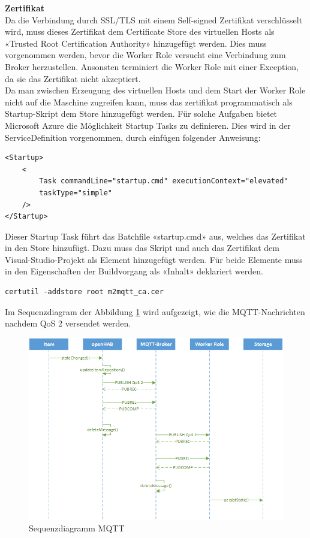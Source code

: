 \textbf{Zertifikat} \\
Da die Verbindung durch SSL/TLS mit einem Self-signed Zertifikat verschlüsselt wird, muss dieses Zertifikat dem Certificate Store des virtuellen Hosts als «Trusted Root Certification Authority» hinzugefügt werden. Dies muss vorgenommen werden, bevor die Worker Role versucht eine Verbindung zum Broker herzustellen. Ansonsten terminiert die Worker Role mit einer Exception, da sie das Zertifikat nicht akzeptiert. \\
Da man zwischen Erzeugung des virtuellen Hosts und dem Start der Worker Role nicht auf die Maschine zugreifen kann, muss das zertifikat programmatisch als Startup-Skript dem Store hinzugefügt werden. Für solche Aufgaben bietet Microsoft Azure die Möglichkeit Startup Tasks zu definieren. Dies wird in der ServiceDefinition vorgenommen, durch einfügen folgender Anweisung:
\begin{lstlisting}[style=csharp, caption=ServiceDefinition.csdef - Startup Task]
<Startup>
	<
		Task commandLine="startup.cmd" executionContext="elevated"
		taskType="simple"
	/>
</Startup>
\end{lstlisting}
Dieser Startup Task führt das Batchfile «startup.cmd» aus, welches das Zertifikat in den Store hinzufügt. Dazu muss das Skript und auch das Zertifikat dem Visual-Studio-Projekt als Element hinzugefügt werden. Für beide Elemente muss in den Eigenschaften der Buildvorgang als «Inhalt» deklariert werden.

\begin{lstlisting}[style=csharp, caption=startup.cmd - Zertifikat hinzufügen]
certutil -addstore root m2mqtt_ca.cer
\end{lstlisting}

Im Sequenzdiagram der Abbildung \ref{fig:sequenzMQTT} wird aufgezeigt, wie die MQTT-Nachrichten nachdem QoS 2 versendet werden.

\begin{figure}[H]
	\centering
		\includegraphics[scale=0.8]{report/img/sequenzDiagramMqtt}
	\caption{Sequenzdiagramm MQTT}
	\label{fig:sequenzMQTT}
\end{figure}



